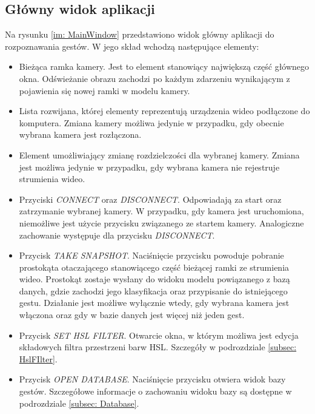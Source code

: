 \subsection{Główny widok aplikacji}
Na rysunku \ref{im: MainWindow} przedstawiono widok główny aplikacji do rozpoznawania gestów. W jego skład wchodzą następujące elementy:
\begin{itemize}
	\item Bieżąca ramka kamery. Jest to element stanowiący największą część głównego okna. Odświeżanie obrazu zachodzi po każdym zdarzeniu wynikającym z pojawienia się nowej ramki w modelu kamery.
	\item Lista rozwijana, której elementy reprezentują urządzenia wideo podłączone do komputera. Zmiana kamery możliwa jedynie w przypadku, gdy obecnie wybrana kamera jest rozłączona.
	\item Element umożliwiający zmianę rozdzielczości dla wybranej kamery. Zmiana jest możliwa jedynie w przypadku, gdy wybrana kamera nie rejestruje strumienia wideo.
	\item Przyciski \textit{CONNECT} oraz \textit{DISCONNECT}. Odpowiadają za start oraz zatrzymanie wybranej kamery. W przypadku, gdy kamera jest uruchomiona, niemożliwe jest użycie przycisku związanego ze startem kamery. Analogiczne zachowanie występuje dla przycisku \textit{DISCONNECT}.
	\item Przycisk \textit{TAKE SNAPSHOT}. Naciśnięcie przycisku powoduje pobranie prostokąta otaczającego stanowiącego część bieżącej ramki ze strumienia wideo. Prostokąt zostaje wysłany do widoku modelu powiązanego z bazą danych, gdzie zachodzi jego klasyfikacja oraz przypisanie do istniejącego gestu. Działanie jest możliwe wyłącznie wtedy, gdy wybrana kamera jest włączona oraz gdy w bazie danych jest więcej niż jeden gest. 
	\item Przycisk \textit{SET HSL FILTER}. Otwarcie okna, w którym możliwa jest edycja składowych filtra przestrzeni barw HSL. Szczegóły w podrozdziale \ref{subsec: HslFIlter}.
	\item Przycisk \textit{OPEN DATABASE}. Naciśnięcie przycisku otwiera widok bazy gestów. Szczegółowe informacje o zachowaniu widoku bazy są dostępne w podrozdziale \ref{subsec: Database}.
\end{itemize}

